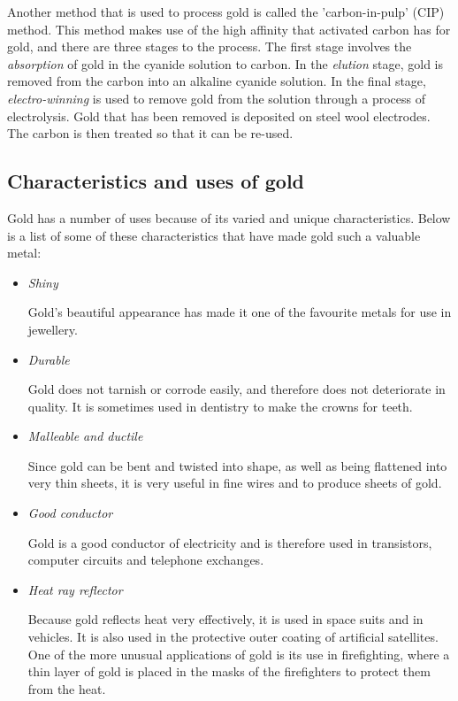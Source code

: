 \begin{IFact}{
Another method that is used to process gold is called the 'carbon-in-pulp' (CIP) method. This method makes use of the high affinity that activated carbon has for gold, and there are three stages to the process. The first stage involves the \emph{absorption} of gold in the cyanide solution to carbon. In the \emph{elution} stage, gold is removed from the carbon into an alkaline cyanide solution. In the final stage, \emph{electro-winning} is used to remove gold from the solution through a process of electrolysis. Gold that has been removed is deposited on steel wool electrodes. The carbon is then treated so that it can be re-used.}
\end{IFact}

\subsection{Characteristics and uses of gold}
Gold has a number of uses because of its varied and unique characteristics. Below is a list of some of these characteristics that have made gold such a valuable metal:
\begin{itemize}

\item \emph{Shiny}

Gold's beautiful appearance has made it one of the favourite metals for use in jewellery.

\item \emph{Durable}

Gold does not tarnish or corrode easily, and therefore does not deteriorate in quality. It is sometimes used in dentistry to make the crowns for teeth.

\item \emph{Malleable and ductile}

Since gold can be bent and twisted into shape, as well as being flattened into very thin sheets, it is very useful in fine wires and to produce sheets of gold.

\item \emph{Good conductor}

Gold is a good conductor of electricity and is therefore used in transistors, computer circuits and telephone exchanges.

\item \emph{Heat ray reflector}

Because gold reflects heat very effectively, it is used in space suits and in vehicles. It is also used in the protective outer coating of artificial satellites. One of the more unusual applications of gold is its use in firefighting, where a thin layer of gold is placed in the masks of the firefighters to protect them from the heat.

\end{itemize}

